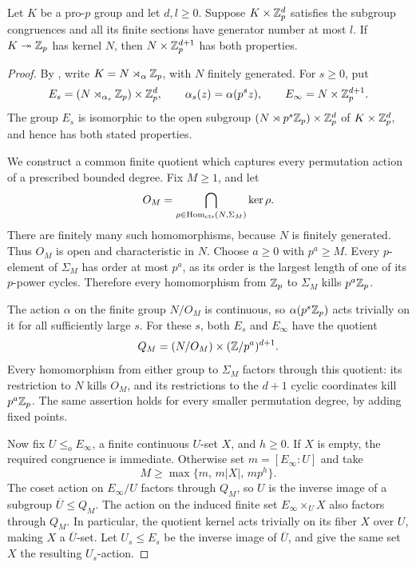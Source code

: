 \begin{lemma}\label{lem:shrinking-action}
Let $K$ be a pro-$p$ group and let $d,l\geq0$.
Suppose $K\times\mathbb Z_p^d$ satisfies the subgroup congruences and all its
finite sections have generator number at most $l$.  If
$K\twoheadrightarrow\mathbb Z_p$ has kernel $N$, then
$N\times\mathbb Z_p^{d+1}$ has both properties.
\end{lemma}

\begin{proof}
By , write
$K=N\rtimes_\alpha\mathbb Z_p$, with $N$ finitely generated.  For $s\geq0$,
put
\[
 E_s=(N\rtimes_{\alpha_s}\mathbb Z_p)\times\mathbb Z_p^d,
 \qquad \alpha_s(z)=\alpha(p^s z),
 \qquad E_\infty=N\times\mathbb Z_p^{d+1}.
\]
The group $E_s$ is isomorphic to the open subgroup
$(N\rtimes p^s\mathbb Z_p)\times\mathbb Z_p^d$ of $K\times\mathbb Z_p^d$, and hence has
both stated properties.

We construct a common finite quotient which captures every permutation
action of a prescribed bounded degree.  Fix $M\geq1$, and let
\[
 O_M=\bigcap_{\rho\in\operatorname{Hom}_{\mathrm{cts}}(N,\Sigma_M)}\ker\rho.
\]
There are finitely many such homomorphisms, because $N$ is finitely
generated.  Thus $O_M$ is open and characteristic in $N$.  Choose
$a\geq0$ with $p^a\geq M$.  Every $p$-element of $\Sigma_M$ has order
at most $p^a$, as its order is the largest length of one of its
$p$-power cycles.  Therefore every homomorphism from $\mathbb Z_p$ to
$\Sigma_M$ kills $p^a\mathbb Z_p$.

The action $\alpha$ on the finite group $N/O_M$ is continuous, so
$\alpha(p^s\mathbb Z_p)$ acts trivially on it for all sufficiently large $s$.
For these $s$, both $E_s$ and $E_\infty$ have the quotient
\begin{equation}\label{eq:shared-permutation-quotient}
 Q_M=(N/O_M)\times(\mathbb Z/p^a)^{d+1}.
\end{equation}
Every homomorphism from either group to $\Sigma_M$ factors through this
quotient: its restriction to $N$ kills $O_M$, and its restrictions to
the $d+1$ cyclic coordinates kill $p^a\mathbb Z_p$.
The same assertion holds for every smaller permutation degree, by
adding fixed points.

Now fix $U\leq_o E_\infty$, a finite continuous $U$-set $X$, and
$h\geq0$.  If $X$ is empty, the required congruence is immediate.
Otherwise set $m=[E_\infty:U]$ and take
\[
 M\geq\max\{m,\,m|X|,\,mp^h\}.
\]
The coset action on $E_\infty/U$ factors through $Q_M$, so $U$ is the
inverse image of a subgroup $\overline U\leq Q_M$.  The action on the
induced finite set $E_\infty\times_U X$ also factors through $Q_M$.
In particular, the quotient kernel acts trivially on its fiber $X$
over $U$, making $X$ a $\overline U$-set.  Let $U_s\leq E_s$ be the
inverse image of $\overline U$, and give the same set $X$ the resulting
$U_s$-action.


\end{proof}
